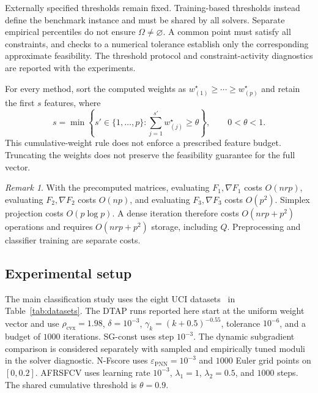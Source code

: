\documentclass[]{interact}
\theoremstyle{plain}
\theoremstyle{definition}
\theoremstyle{remark}
\newtheorem{remark}{Remark}
\newcommand{\cvx}{\mathrm{cvx}}
\begin{document}
Externally specified thresholds remain fixed. Training-based thresholds instead define the benchmark instance and must be shared by all solvers. Separate empirical percentiles do not ensure $\Omega\ne\varnothing$. A common point must satisfy all constraints, and checks to a numerical tolerance establish only the corresponding approximate feasibility. The threshold protocol and constraint-activity diagnostics are reported with the experiments.

For every method, sort the computed weights as $w^\star_{(1)}\ge\cdots\ge w^\star_{(p)}$ and retain the first $s$ features, where
\begin{equation}\label{eq:thetaRule}
s=\min\left\{s'\in\{1,\ldots,p\}:\sum_{j=1}^{s'}w^\star_{(j)}\ge\theta\right\},\qquad 0<\theta<1.
\end{equation}
This cumulative-weight rule does not enforce a prescribed feature budget. Truncating the weights does not preserve the feasibility guarantee for the full vector.

\begin{remark}\label{rem:fs-cost}
With the precomputed matrices, evaluating $F_1,\nabla F_1$ costs $O(nrp)$, evaluating $F_2,\nabla F_2$ costs $O(np)$, and evaluating $F_3,\nabla F_3$ costs $O(p^2)$. Simplex projection costs $O(p\log p)$. A dense iteration therefore costs $O(nrp+p^2)$ operations and requires $O(nrp+p^2)$ storage, including $Q$. Preprocessing and classifier training are separate costs.
\end{remark}

\subsection{Experimental setup}\label{ssec:setup}
The main classification study uses the eight UCI datasets~\citep{kelly2023uci} in Table~\ref{tab:datasets}. The DTAP runs reported here start at the uniform weight vector and use $\rho_{\cvx}=1.98$, $\delta=10^{-3}$, $\gamma_k=(k+0.5)^{-0.55}$, tolerance $10^{-6}$, and a budget of $1000$ iterations. SG-const uses step $10^{-3}$. The dynamic subgradient comparison is considered separately with sampled and empirically tuned moduli in the solver diagnostic. N-Fscore uses $\varepsilon_{\mathrm{PNN}}=10^{-3}$ and $1000$ Euler grid points on $[0,0.2]$. AFRSFCV uses learning rate $10^{-3}$, $\lambda_1=1$, $\lambda_2=0.5$, and $1000$ steps. The shared cumulative threshold is $\theta=0.9$.
\end{document}
